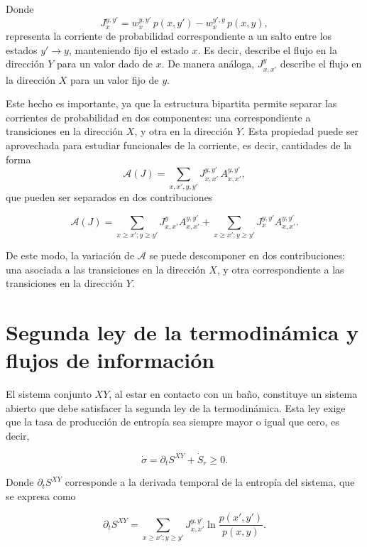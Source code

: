Donde  
\[
J_{x}^{y,y'} = w_{x}^{y,y'}\,p(x,y') - w_{x}^{y',y}\,p(x,y),
\]
representa la corriente de probabilidad correspondiente a un salto entre los estados \( y' \to y \), manteniendo fijo el estado \( x \). Es decir, describe el flujo en la dirección \( Y \) para un valor dado de \( x \). De manera análoga, $J^{y}_{x,x'}$ describe el flujo en la dirección \( X\) para un valor fijo de \(y\).  

Este hecho es importante, ya que la estructura bipartita permite separar las corrientes de probabilidad en dos componentes: una correspondiente a transiciones en la dirección \( X \), y otra en la dirección \( Y \). Esta propiedad puede ser aprovechada para estudiar funcionales de la corriente, es decir, cantidades de la forma
\[
\mathcal{A}(J) = \sum_{x,x',y,y'} J_{x,x'}^{y,y'}\, A_{x,x'}^{y,y'},
\]
que pueden ser separados en dos contribuciones

\begin{equation}
    \mathcal{A}(J) = \sum_{x\geq x';y \geq y'} J_{x,x'}^{y}A_{x,x'}^{y,y'} + \sum_{x \geq x'; y \geq y'}J_{x}^{y,y'} A_{x,x'}^{y,y'}.
\label{sec4:functionalcurrent}
\end{equation}

De este modo, la variación de \( \mathcal{A} \) se puede descomponer en dos contribuciones: una asociada a las transiciones en la dirección \( X \), y otra correspondiente a las transiciones en la dirección \( Y \).


\label{sec4:flujos}
\section{Segunda ley de la termodinámica y flujos de información}
El sistema conjunto \( XY \), al estar en contacto con un baño, constituye un sistema abierto que debe satisfacer la segunda ley de la termodinámica. Esta ley exige que la tasa de producción de entropía sea siempre mayor o igual que cero, es decir, 

\begin{equation*}
    \dot{\sigma} = \partial_{t}S^{XY} + \dot{S}_{r} \geq 0. 
\end{equation*}

Donde $\partial_{t}S^{XY}$ corresponde a la derivada temporal de la entropía del sistema, que se expresa como  

\begin{equation*}
    \partial_{t}S^{XY} = \sum_{x\geq x'; y\geq y'} J_{x,x'}^{y,y'} \ln \frac{p(x',y')}{p(x,y)}.
\end{equation*}

